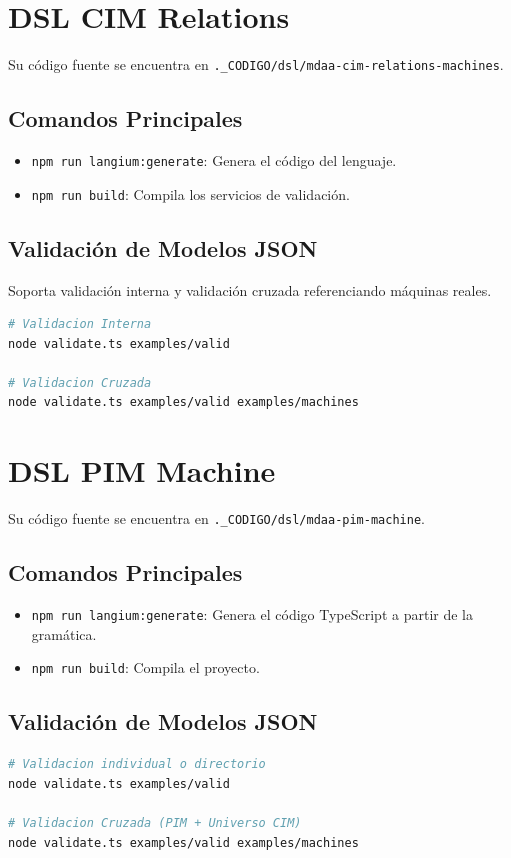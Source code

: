 \section{DSL CIM Relations}

Su código fuente se encuentra en \texttt{.\_CODIGO/dsl/mdaa-cim-relations-machines}.


\subsection{Comandos Principales}
\begin{itemize}
    \item \texttt{npm run langium:generate}: Genera el código del lenguaje.
    \item \texttt{npm run build}: Compila los servicios de validación.
\end{itemize}

\subsection{Validación de Modelos JSON}
Soporta validación interna y validación cruzada referenciando máquinas reales.

\begin{lstlisting}[language=bash]
# Validacion Interna
node validate.ts examples/valid

# Validacion Cruzada
node validate.ts examples/valid examples/machines
\end{lstlisting}

\section{DSL PIM Machine}

Su código fuente se encuentra en \texttt{.\_CODIGO/dsl/mdaa-pim-machine}.

\subsection{Comandos Principales}
\begin{itemize}
    \item \texttt{npm run langium:generate}: Genera el código TypeScript a partir de la gramática.
    \item \texttt{npm run build}: Compila el proyecto.
\end{itemize}

\subsection{Validación de Modelos JSON}
\begin{lstlisting}[language=bash]
# Validacion individual o directorio
node validate.ts examples/valid

# Validacion Cruzada (PIM + Universo CIM)
node validate.ts examples/valid examples/machines
\end{lstlisting}

